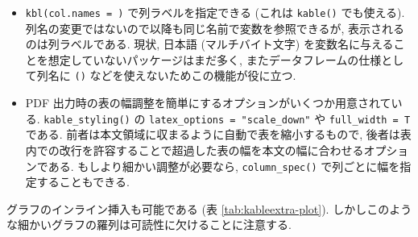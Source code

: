 \documentclass[
]{bxjsbook}
\providecommand{\tightlist}{%
  \setlength{\itemsep}{0pt}\setlength{\parskip}{0pt}}
\theoremstyle{definition}
\theoremstyle{definition}
\theoremstyle{definition}
\theoremstyle{remark}
\begin{document}
\begin{itemize}
\tightlist
\item
  \texttt{kbl(col.names\ =\ )} で列ラベルを指定できる (これは
  \texttt{kable()} でも使える).
  列名の変更ではないので以降も同じ名前で変数を参照できるが,
  表示されるのは列ラベルである. 現状, 日本語 (マルチバイト文字)
  を変数名に与えることを想定していないパッケージはまだ多く,
  またデータフレームの仕様として列名に \texttt{()}
  などを使えないためこの機能が役に立つ.
\item
  PDF 出力時の表の幅調整を簡単にするオプションがいくつか用意されている.
  \texttt{kable\_styling()} の \texttt{latex\_options\ =\ "scale\_down"}
  や \texttt{full\_width\ =\ T} である.
  前者は本文領域に収まるように自動で表を縮小するもので,
  後者は表内での改行を許容することで超過した表の幅を本文の幅に合わせるオプションである.
  もしより細かい調整が必要なら, \texttt{column\_spec()}
  で列ごとに幅を指定することもできる.
\end{itemize}

グラフのインライン挿入も可能である (表 \ref{tab:kableextra-plot}).
しかしこのような細かいグラフの羅列は可読性に欠けることに注意する.
\end{document}
